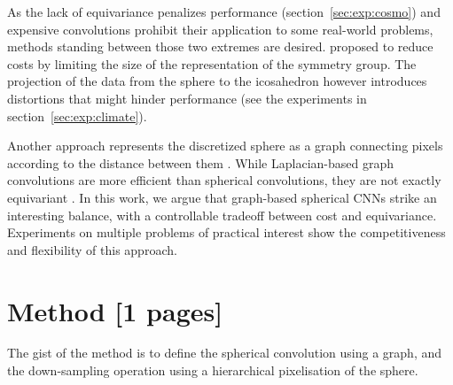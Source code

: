 \documentclass{article} %
\newcommand{\todo}[1]{{\color[rgb]{.6,.1,.6}{#1}}}
\renewcommand{\secref}[1]{section~\ref{sec:#1}}
\begin{document}
As the lack of equivariance penalizes performance (\secref{exp:cosmo}) and expensive convolutions prohibit their application to some real-world problems, methods standing between those two extremes are desired.
\citet{cohen2019gauge} proposed to reduce costs by limiting the size of the representation of the symmetry group.
\todo{not all rotations, subset of SO(3)?}
The projection of the data from the sphere to the icosahedron however introduces distortions that might hinder performance (see the experiments in \secref{exp:climate}).
\todo{Where does Jiang fit? Need a global coordinate system (ok for planets, not projections like cosmo)}

Another approach represents the discretized sphere as a graph connecting pixels according to the distance between them \citep{bruna2013gnn, khasanova2017sphericalcnn, perraudin2019deepspherecosmo}.
While Laplacian-based graph convolutions are more efficient than spherical convolutions, they are not exactly equivariant \citep{defferrard2019deepsphereequiv}.
In this work, we argue that graph-based spherical CNNs strike an interesting balance, with a controllable tradeoff between cost and equivariance.
Experiments on multiple problems of practical interest show the competitiveness and flexibility of this approach.

\section{Method [1 pages]}

The gist of the method is to define the spherical convolution using a graph, and the down-sampling operation using a hierarchical pixelisation of the sphere.

\todo{
	* discuss discretizations (equiangular, HEALPix, icosahedral sphere) -> more uniform is better \\
	* no uniform sampling: tradeoffs have to be made \\
	* CNN vs FCN discussion (GAP for invariance) \\
}
\end{document}
